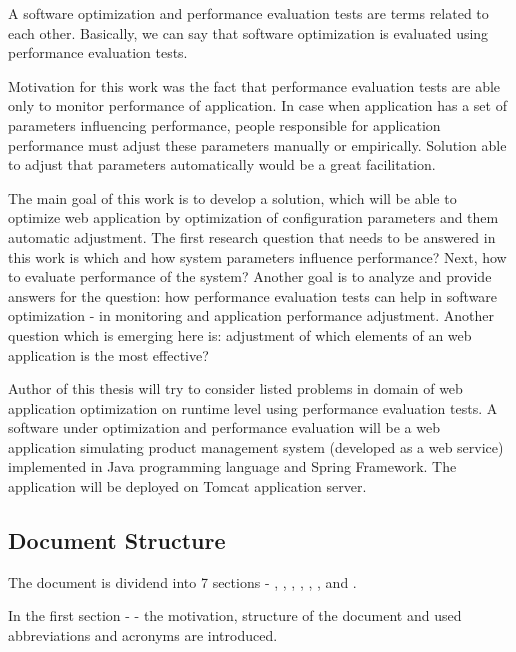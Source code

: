\documentclass[12pt,a4paper]{article}
\begin{document}
A software optimization and performance evaluation tests are terms related to each other. Basically, we can say that software optimization is evaluated using performance evaluation tests. 

Motivation for this work was the fact that performance evaluation tests are able only to monitor performance of application. In case when application has a set of parameters influencing performance, people responsible for application performance must adjust these parameters manually or empirically. Solution able to adjust that parameters automatically would be a great facilitation. 

The main goal of this work is to develop a solution, which will be able to optimize web application by optimization of configuration parameters and them automatic adjustment. The first research question that needs to be answered in this work is which and how system parameters influence performance? Next, how to evaluate performance of the system? Another goal is to analyze and provide answers for the question: how performance evaluation tests can help in software optimization - in monitoring and application performance adjustment. Another question which is emerging here is: adjustment of which elements of an web application is the most effective? 

Author of this thesis will try to consider listed problems in domain of web application optimization on runtime level using performance evaluation tests. A software under optimization and performance evaluation will be a web application simulating product management system (developed as a web service) implemented in Java programming language and Spring Framework. The application will be deployed on Tomcat application server. 

\pagebreak
\subsection{Document Structure}

The document is dividend into 7 sections - 
\textit{}, 
\textit{}, 
\textit{}, 
\textit{}, 
\textit{}, 
\textit{}, 
\textit{} and 
\textit{}. 

In the first section - \textit{} - the motivation, structure of the document and used abbreviations and acronyms are introduced. 
\end{document}
